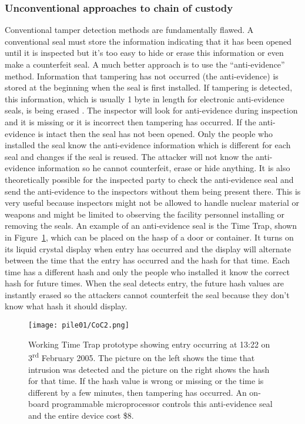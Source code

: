 \documentclass[twocolumn,a4paper]{article}
\begin{document}
\subsubsection{Unconventional approaches to chain of custody}

Conventional tamper detection methods are fundamentally flawed. A
conventional seal must store the information indicating that it has
been opened until it is inspected but it’s too easy to hide or erase
this information or even make a counterfeit seal. A much better
approach is to use the ``anti-evidence'' method. Information that
tampering has not occurred (the anti-evidence) is stored at the
beginning when the seal is first installed. \citep{nuclearSafeguardsAndSec2005} If tampering is
detected, this information, which is usually 1 byte in length for
electronic anti-evidence seals, is being erased \citep{unconventionalCoC2010}.  The inspector
will look for anti-evidence during inspection and it is missing or it
is incorrect then tampering has occurred. If the anti-evidence is
intact then the seal has not been opened. Only the people who
installed the seal know the anti-evidence information which is
different for each seal and changes if the seal is reused. The
attacker will not know the anti-evidence information so he cannot
counterfeit, erase or hide anything. \citep{nuclearSafeguardsAndSec2005} It is also theoretically
possible for the inspected party to check the anti-evidence seal and
send the anti-evidence to the inspectors without them being present
there. \citep{unconventionalCoC2010} This is very useful because inspectors might not be
allowed to handle nuclear material or weapons and might be limited to
observing the facility personnel installing or removing the seals. An
example of an anti-evidence seal is the Time Trap, shown in
Figure~\ref{fig:CoC2}, which can be placed on the hasp of a door or
container. It turns on its liquid crystal display when entry has
occurred and the display will alternate between the time that the
entry has occurred and the hash for that time. Each time has a
different hash and only the people who installed it know the correct
hash for future times. When the seal detects entry, the future hash
values are instantly erased so the attackers cannot counterfeit the
seal because they don't know what hash it should display. \citep{nuclearSafeguardsAndSec2005}

\begin{figure}
  \texttt{[image: pile01/CoC2.png]}
  \caption{Working Time Trap prototype showing entry occurring at
    13:22 on 3\textsuperscript{rd} February 2005. The picture on the
    left shows the time that intrusion was detected and the picture on
    the right shows the hash for that time. If the hash value is wrong
    or missing or the time is different by a few minutes, then
    tampering has occurred. An on-board programmable microprocessor
    controls this anti-evidence seal and the entire device cost
    \$8. \citep{nuclearSafeguardsAndSec2005}}
  \label{fig:CoC2}
\end{figure}
\end{document}
